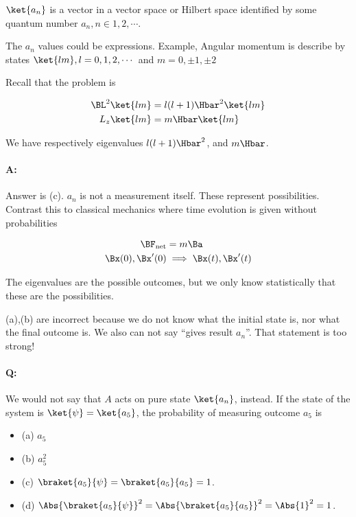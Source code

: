 \(\ket{a_n}\) is a vector in a vector space or Hilbert space identified by some quantum number \(a_n, n \in 1,2, \cdots\).

The \(a_n\) values could be expressions.  Example, Angular momentum is describe by states \(\ket{lm}, l = 0,1,2,\cdots\) and \(m = 0, \pm 1, \pm 2\)

Recall that the problem is

\begin{equation}\label{eqn:PHY356HNov2:10}
\begin{aligned}
\BL^2 \ket{lm} &= l(l+1) \Hbar^2 \ket{lm} \\
L_z \ket{lm} &= m \Hbar \ket{lm}
\end{aligned}
\end{equation}

We have respectively eigenvalues \(l(l+1)\Hbar^2\), and \(m \Hbar\).

\paragraph{A:} Answer is (c).  \(a_n\) is not a measurement itself.  These represent possibilities.  Contrast this to classical mechanics where time evolution is given without probabilities

\begin{equation}\label{eqn:PHY356HNov2:20}
\begin{aligned}
\BF_{\text{net}} &= m \Ba \\
\Bx(0), \Bx'(0) &\implies \Bx(t), \Bx'(t)
\end{aligned}
\end{equation}

The eigenvalues are the possible outcomes, but we only know statistically that these are the possibilities.

(a),(b) are incorrect because we do not know what the initial state is, nor what the final outcome is.  We also can not say ``gives result \(a_n\)''.  That statement is too strong!

\paragraph{Q:} We would not say that \(A\) acts on pure state \(\ket{a_n}\), instead.  If the state of the system is \(\ket{\psi} = \ket{a_5}\), the probability of measuring outcome \(a_5\) is
\begin{itemize}
\item (a) \(a_5\)
\item (b) \(a_5^2\)
\item (c) \(\braket{a_5}{\psi} = \braket{a_5}{a_5} = 1\).
\item (d) \(\Abs{\braket{a_5}{\psi}}^2 = \Abs{\braket{a_5}{a_5}}^2 = \Abs{1}^2 = 1\).
\end{itemize}

